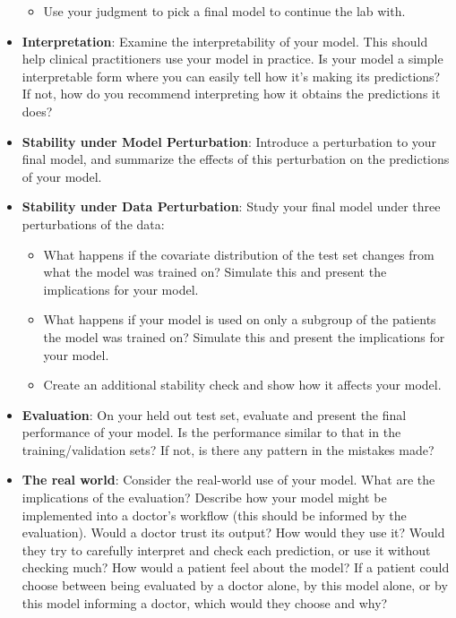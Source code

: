 \documentclass[letterpaper,12pt]{article}
\begin{document}
\begin{itemize}
\begin{itemize}
            \item Use your judgment to pick a final model to continue the lab with.
        \end{itemize}
    \item \textbf{Interpretation}: Examine the interpretability of your model. This should help clinical practitioners use your model in practice. Is your model a simple interpretable form where you can easily tell how it's making its predictions? If not, how do you recommend interpreting how it obtains the predictions it does?
    \item \textbf{Stability under Model Perturbation}: Introduce a perturbation to your final model, and summarize the effects of this perturbation on the predictions of your model.
    \item \textbf{Stability under Data Perturbation}: Study your final model under three perturbations of the data:
        \begin{itemize}
            \item What happens if the covariate distribution of the test set changes from what the model was trained on? Simulate this and present the implications for your model.
            \item What happens if your model is used on only a subgroup of the patients the model was trained on? Simulate this and present the implications for your model.
            \item Create an additional stability check and show how it affects your model.
        \end{itemize}
    \item \textbf{Evaluation}: On your held out test set, evaluate and present the final performance of your model. Is the performance similar to that in the training/validation sets? If not, is there any pattern in the mistakes made?
    \item \textbf{The real world}: Consider the real-world use of your model. What are the implications of the evaluation? Describe how your model might be implemented into a doctor's workflow (this should be informed by the evaluation). Would a doctor trust its output? How would they use it? Would they try to carefully interpret and check each prediction, or use it without checking much? How would a patient feel about the model? If a patient could choose between being evaluated by a doctor alone, by this model alone, or by this model informing a doctor, which would they choose and why?
\end{itemize}
\end{document}

